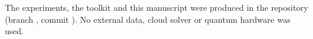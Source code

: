 {\sloppy
The experiments, the toolkit and this manuscript were produced in the \repo{} repository
(branch , commit \sha). No external data, cloud solver or
quantum hardware was used.\par}
